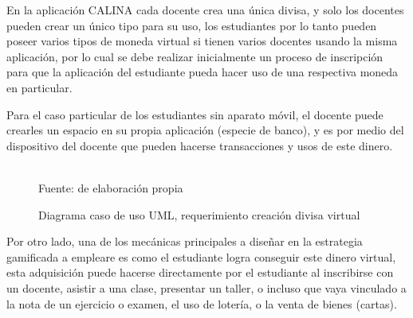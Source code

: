En la aplicación CALINA cada docente crea una única divisa, y solo los docentes pueden crear un único tipo 
para su uso, los estudiantes por lo tanto pueden poseer varios tipos de moneda virtual si tienen varios 
docentes usando la misma aplicación, por lo cual se debe realizar inicialmente un proceso de inscripción para
que la aplicación del estudiante pueda hacer uso de una respectiva moneda en particular.

Para el caso particular de los estudiantes sin aparato móvil, el docente puede crearles un espacio en su
propia aplicación (especie de banco), y es por medio del dispositivo del docente que pueden hacerse 
transacciones y usos de este dinero.

\begin{figure}[ht]
\caption{Diagrama caso de uso UML, requerimiento creación divisa virtual}
\label{img:UMLcreaciondivisa}
\centering
\begin{adjustbox}{width=13cm}
\end{adjustbox}
\\
{\footnotesize Fuente: de elaboración propia}
\end{figure}

Por otro lado, una de los mecánicas principales a diseñar en la estrategia gamificada a empleare es como el 
estudiante logra conseguir este dinero virtual, esta adquisición puede hacerse directamente por el estudiante 
al inscribirse con un docente, asistir a una clase, presentar un taller, o incluso que vaya vinculado a 
la nota de un ejercicio o examen, el uso de lotería, o la venta de bienes (cartas).

